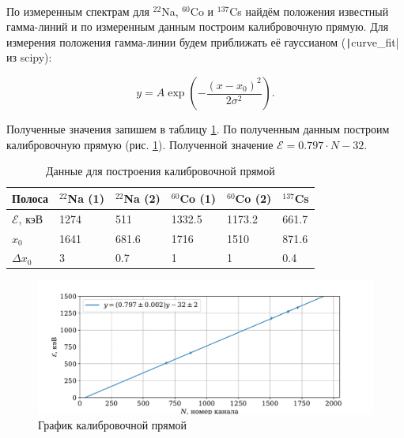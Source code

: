\documentclass[a4paper,12pt]{article} %
\begin{document}
\paragraph{}По измеренным спектрам для $^{22}$Na, $^{60}$Co и $^{137}$Cs найдём положения известный гамма-линий и по измеренным данным построим калибровочную прямую. Для измерения положения гамма-линии будем приближать её гауссианом (\texttt|curve_fit| из scipy):

\begin{equation}
y = A \exp{\left( - \frac{(x - x_0)^2}{2 \sigma^2} \right)}.
\label{e:gauss}
\end{equation}

Полученные значения запишем в таблицу \ref{tab:calib}. По полученным данным построим калибровочную прямую (рис. \ref{fig:calib}). Полученной значение $\mathcal{E} = 0.797 \cdot N - 32$.

\begin{table}[h]
\centering
\begin{tabular}{|l|l|l|l|l|l|}
\hline
Полоса             & $^{22}$Na (1) & $^{22}$Na (2) & $^{60}$Co (1) & $^{60}$Co (2) & $^{137}$Cs \\ \hline
$\mathcal{E}$, кэВ & 1274          & 511           & 1332.5        & 1173.2        & 661.7      \\ \hline
$x_0$              & 1641          & 681.6         & 1716          & 1510          & 871.6      \\ \hline
$\Delta x_0$       & 3             & 0.7           & 1             & 1             & 0.4        \\ \hline
\end{tabular}
\caption{Данные для построения калибровочной прямой}
\label{tab:calib}
\end{table}

\begin{figure}[h]
\centering
\includegraphics[width=\textwidth]{calibration.pdf}
\caption{График калибровочной прямой}
\label{fig:calib}
\end{figure}
\end{document}
